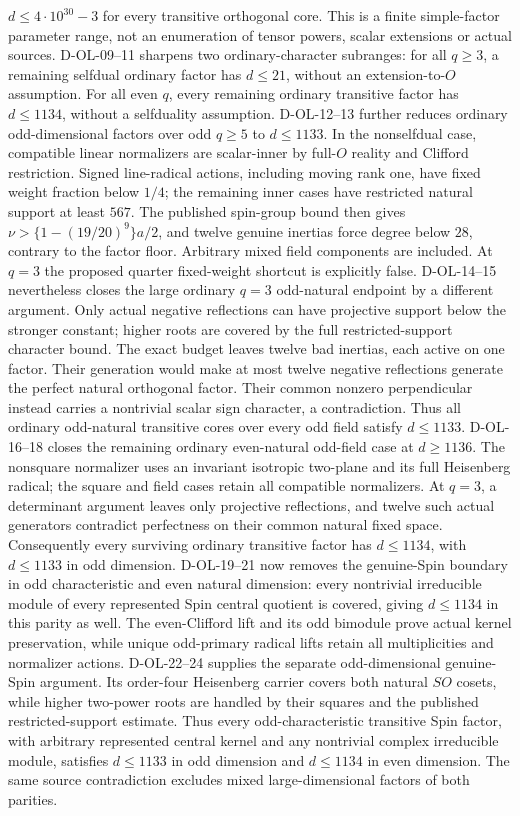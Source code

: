 \documentclass[11pt]{article}
\theoremstyle{remark}\newtheorem{remark}[theorem]{Remark}
\begin{document}
$d\le4\cdot10^{30}-3$ for every transitive orthogonal core.
This is a finite simple-factor parameter range, not an enumeration
of tensor powers, scalar extensions or actual sources.
D-OL-09--11 sharpens two ordinary-character subranges: for all $q\ge3$,
a remaining selfdual ordinary factor has $d\le21$, without an
extension-to-$O$ assumption. For all even $q$, every remaining ordinary
transitive factor has $d\le1134$, without a selfduality assumption.
D-OL-12--13 further reduces ordinary odd-dimensional factors over odd
$q\ge5$ to $d\le1133$. In the nonselfdual case, compatible linear
normalizers are scalar-inner by full-$O$ reality and Clifford restriction.
Signed line-radical actions, including moving rank one, have fixed weight
fraction below $1/4$; the remaining inner cases have restricted natural
support at least $567$. The published spin-group bound then gives
$\nu>\{1-(19/20)^9\}a/2$, and twelve genuine inertias force degree
below $28$, contrary to the factor floor. Arbitrary mixed field components
are included. At $q=3$ the proposed quarter fixed-weight shortcut is
explicitly false. D-OL-14--15 nevertheless closes the large ordinary
$q=3$ odd-natural endpoint by a different argument. Only actual negative
reflections can have projective support below the stronger constant;
higher roots are covered by the full restricted-support character bound.
The exact budget leaves twelve bad inertias, each active on one factor.
Their generation would make at most twelve negative reflections generate
the perfect natural orthogonal factor. Their common nonzero perpendicular
instead carries a nontrivial scalar sign character, a contradiction.
Thus all ordinary odd-natural transitive cores over every odd field
satisfy $d\le1133$. D-OL-16--18 closes the remaining ordinary
even-natural odd-field case at $d\ge1136$. The nonsquare normalizer
uses an invariant isotropic two-plane and its full Heisenberg radical;
the square and field cases retain all compatible normalizers. At
$q=3$, a determinant argument leaves only projective reflections,
and twelve such actual generators contradict perfectness on their
common natural fixed space. Consequently every surviving ordinary
transitive factor has $d\le1134$, with $d\le1133$ in odd dimension.
D-OL-19--21 now removes the genuine-Spin boundary in odd
characteristic and even natural dimension: every nontrivial
irreducible module of every represented Spin central quotient
is covered, giving $d\le1134$ in this parity as well.
The even-Clifford lift and its odd bimodule prove actual
kernel preservation, while unique odd-primary radical lifts
retain all multiplicities and normalizer actions. D-OL-22--24 supplies the separate odd-dimensional genuine-Spin
argument. Its order-four Heisenberg carrier covers both natural
$SO$ cosets, while higher two-power roots are handled by their
squares and the published restricted-support estimate. Thus
every odd-characteristic transitive Spin factor, with arbitrary
represented central kernel and any nontrivial complex irreducible
module, satisfies $d\le1133$ in odd dimension and $d\le1134$
in even dimension. The same source contradiction excludes mixed
large-dimensional factors of both parities.
\end{document}
